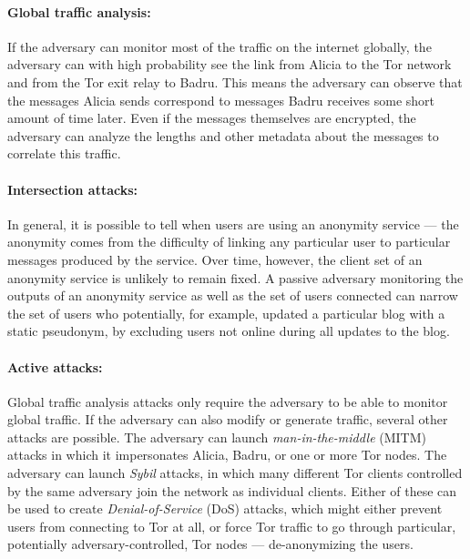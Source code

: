 \paragraph{Global traffic analysis:}
If the adversary can monitor most of the traffic on the internet globally,
the adversary can with high probability see the link from Alicia to the Tor
network and from the Tor exit relay to Badru. This means the adversary can
observe that the messages Alicia sends correspond to messages Badru receives
some short amount of time later. Even if the messages themselves are
encrypted, the adversary can analyze the lengths and other metadata about
the messages to correlate this traffic.
\paragraph{Intersection attacks:}
In general, it is possible to tell when users are using an anonymity service
--- the anonymity comes from the difficulty of linking any particular user
to particular messages produced by the service. Over time, however, the
client set of an anonymity service is unlikely to remain fixed. A passive
adversary monitoring the outputs of an anonymity service as well as the set
of users connected can narrow the set of users who potentially, for example,
updated a particular blog with a static pseudonym, by excluding users  not
online during all updates to the blog.
\paragraph{Active attacks:}
Global traffic analysis attacks only require the adversary to be able to
monitor global traffic. If the adversary can also modify or generate
traffic, several other attacks are possible. The adversary can launch
\emph{man-in-the-middle} (MITM) attacks in which it impersonates Alicia,
Badru, or one or more Tor nodes. The adversary can launch \emph{Sybil}
attacks, in which many different Tor clients controlled by the same
adversary join the network as individual clients. Either of these can be
used to create \emph{Denial-of-Service} (DoS) attacks, which might either
prevent users from connecting to Tor at all, or force Tor traffic to go
through particular, potentially adversary-controlled, Tor nodes ---
de-anonymizing the users.
